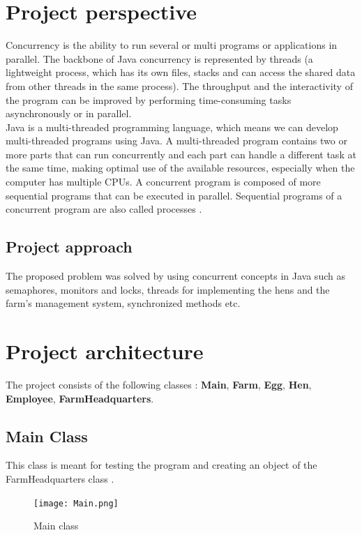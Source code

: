 \documentclass{article}
\begin{document}
\section{Project perspective}
Concurrency is the ability to run several or multi programs or applications in parallel. The backbone of Java concurrency is represented by threads (a lightweight process, which has its own files, stacks and can access the shared data from other threads in the same process). The throughput and the interactivity of the program can be improved by performing time-consuming tasks asynchronously or in parallel.
\\ 
Java is a multi-threaded programming language, which means we can develop multi-threaded programs using Java. A multi-threaded program contains two or more parts that can run concurrently and each part can handle a different task at the same time, making optimal use of the available resources, especially when the computer has multiple CPUs. 
\newline
A concurrent program is composed of more sequential programs that can be executed in parallel. Sequential programs of a concurrent program are also called processes .


\subsection{Project approach}
The proposed problem was solved by using concurrent concepts
in Java such as semaphores, monitors and locks, threads for implementing the hens and the farm's management system, synchronized methods etc.

\section{Project architecture}
The project consists of the following classes : \textbf{Main},  \textbf{Farm},  \textbf{Egg}, \textbf{Hen},  \textbf{Employee},  \textbf{FarmHeadquarters}.
\subsection{Main Class}
This class is meant for testing the program and creating an object of the FarmHeadquarters class .
\newline

\begin{figure}[htp]
    \centering
    \texttt{[image: Main.png]}
    \caption{Main class}
\end{figure}
\end{document}
